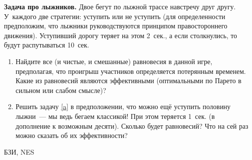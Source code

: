 \begin{problem}
 {\bf Задача про лыжников.} Двое бегут по лыжной
трассе навстречу друг другу. У~каждого две стратегии:
уступить или не уступить (для определенности предположим,
что лыжники руководствуются принципом правостороннего
движения). Уступивший дорогу теряет на этом 2~сек., а если
столкнулись, то будут распутываться 10~сек.

\begin{enumerate}

\item\label{a} Найдите все (и чистые, и смешанные)
равновесия в данной игре, предполагая, что проигрыш
участников определяется потерянным временем. Какие из
равновесий являются эффективными (оптимальными по Парето в
сильном или слабом смысле)?

\item Решить задачу \ref{a} в предположении, что можно ещё
уступить половину лыжни~--- мы ведь бегаем классикой! При
этом теряется 1~сек. (в дополнение к возможным десяти).
Сколько будет равновесий? Что на сей раз можно сказать об
их эффективности?

\end{enumerate}




\begin{source}
БЗИ, NES
\end{source}


\begin{sol}

\end{sol}
\end{problem}





